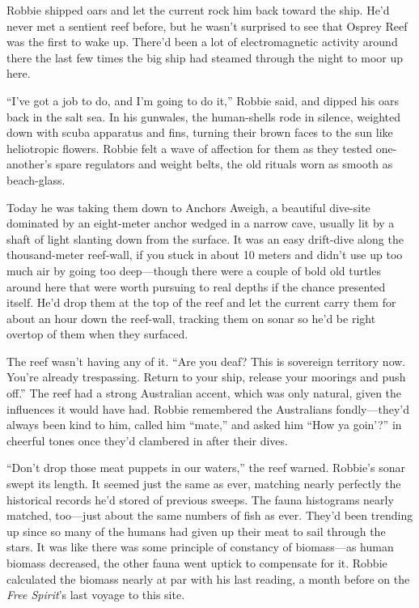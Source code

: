 Robbie shipped oars and let the current rock him back toward the
ship. He’d never met a sentient reef before, but he wasn’t
surprised to see that Osprey Reef was the first to wake up. There’d
been a lot of electromagnetic activity around there the last few
times the big ship had steamed through the night to moor up here.

“I’ve got a job to do, and I’m going to do it,” Robbie said, and
dipped his oars back in the salt sea. In his gunwales, the
human-shells rode in silence, weighted down with scuba apparatus
and fins, turning their brown faces to the sun like heliotropic
flowers. Robbie felt a wave of affection for them as they tested
one-another’s spare regulators and weight belts, the old rituals
worn as smooth as beach-glass.

Today he was taking them down to Anchors Aweigh, a beautiful
dive-site dominated by an eight-meter anchor wedged in a narrow
cave, usually lit by a shaft of light slanting down from the
surface. It was an easy drift-dive along the thousand-meter
reef-wall, if you stuck in about 10 meters and didn’t use up too
much air by going too deep—though there were a couple of bold old
turtles around here that were worth pursuing to real depths if the
chance presented itself. He’d drop them at the top of the reef and
let the current carry them for about an hour down the reef-wall,
tracking them on sonar so he’d be right overtop of them when they
surfaced.

The reef wasn’t having any of it. “Are you deaf? This is sovereign
territory now. You’re already trespassing. Return to your ship,
release your moorings and push off.” The reef had a strong
Australian accent, which was only natural, given the influences it
would have had. Robbie remembered the Australians fondly—they’d
always been kind to him, called him “mate,” and asked him “How ya
goin’?” in cheerful tones once they’d clambered in after their
dives.

“Don’t drop those meat puppets in our waters,” the reef warned.
Robbie’s sonar swept its length. It seemed just the same as ever,
matching nearly perfectly the historical records he’d stored of
previous sweeps. The fauna histograms nearly matched, too—just
about the same numbers of fish as ever. They’d been trending up
since so many of the humans had given up their meat to sail through
the stars. It was like there was some principle of constancy of
biomass—as human biomass decreased, the other fauna went uptick to
compensate for it. Robbie calculated the biomass nearly at par with
his last reading, a month before on the \emph{Free Spirit}’s last
voyage to this site.

